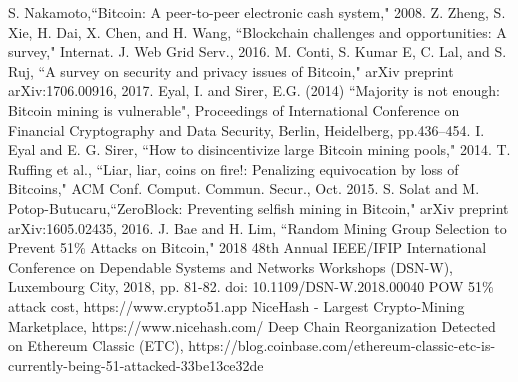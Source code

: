 \documentclass[conference]{IEEEtran}
\begin{document}
\begin{thebibliography}{00}

 S. Nakamoto,``Bitcoin: A peer-to-peer electronic cash system," 2008.
 Z. Zheng, S. Xie, H. Dai, X. Chen, and H. Wang, ``Blockchain challenges
and opportunities: A survey," Internat. J. Web Grid Serv., 2016.
M. Conti, S. Kumar E, C. Lal, and S. Ruj, ``A survey on security and privacy issues of Bitcoin," arXiv preprint arXiv:1706.00916, 2017.
 Eyal, I. and Sirer, E.G. (2014) ``Majority is not enough: Bitcoin mining is vulnerable", Proceedings
of International Conference on Financial Cryptography and Data Security, Berlin, Heidelberg,
pp.436–454.
 I. Eyal and E. G. Sirer, ``How to disincentivize large Bitcoin mining pools," 2014.
 T. Ruffing et al., “Liar, liar, coins on fire!: Penalizing equivocation by loss of Bitcoins," ACM Conf. Comput. Commun. Secur., Oct. 2015.
 S. Solat and M. Potop-Butucaru,``ZeroBlock: Preventing selfish mining in Bitcoin," arXiv preprint arXiv:1605.02435, 2016.
 J. Bae and H. Lim, ``Random Mining Group Selection to Prevent 51\% Attacks on Bitcoin," 2018 48th Annual IEEE/IFIP International Conference on Dependable Systems and Networks Workshops (DSN-W), Luxembourg City, 2018, pp. 81-82.
doi: 10.1109/DSN-W.2018.00040
 POW 51\% attack cost, https://www.crypto51.app
 NiceHash - Largest Crypto-Mining Marketplace, https://www.nicehash.com/
 Deep Chain Reorganization Detected on Ethereum Classic (ETC), https://blog.coinbase.com/ethereum-classic-etc-is-currently-being-51-attacked-33be13ce32de

\end{thebibliography}
\vspace{12pt}
\color{red}
\end{document}
